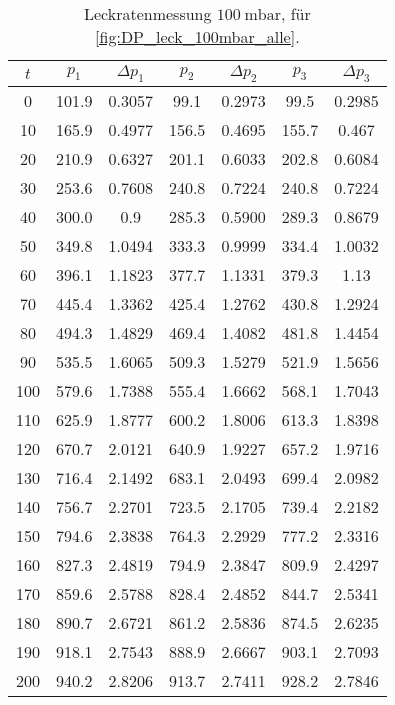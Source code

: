 \begin{table}[H]
    \centering
    \caption{Leckratenmessung $\SI{100}{\milli\bar}$, für  \autoref{fig:DP_leck_100mbar_alle}.}
    \label{tab:DP_leck_100mbar_alle}
    \begin{tabular}{c c c c c c c}
        \toprule
        {$t$} & {$p_1$} & {$\Delta p_1$} & {$p_2$} & {$\Delta p_2$} & {$p_3$} & {$\Delta p_3$} \\
        \midrule
        0 & 101.9 & 0.3057 & 99.1 & 0.2973 & 99.5 & 0.2985 \\
        10 & 165.9 & 0.4977 & 156.5 & 0.4695 & 155.7 & 0.467  \\
        20 & 210.9 & 0.6327 & 201.1 & 0.6033 & 202.8 & 0.6084  \\
        30 & 253.6 & 0.7608 & 240.8 & 0.7224 & 240.8 & 0.7224  \\
        40 & 300.0 & 0.9 & 285.3 & 0.5900 & 289.3 & 0.8679  \\
        50 & 349.8 & 1.0494 & 333.3 & 0.9999 & 334.4 & 1.0032  \\
        60 & 396.1 & 1.1823 & 377.7 & 1.1331 & 379.3 & 1.13  \\
        70 & 445.4 & 1.3362 & 425.4 & 1.2762 & 430.8 & 1.2924  \\
        80 & 494.3 & 1.4829 & 469.4 & 1.4082 & 481.8 & 1.4454  \\
        90 & 535.5 & 1.6065 & 509.3 & 1.5279 & 521.9 & 1.5656  \\
        100 & 579.6 & 1.7388 & 555.4 & 1.6662 & 568.1 & 1.7043 \\
        110 & 625.9 & 1.8777 & 600.2 & 1.8006 & 613.3 & 1.8398 \\
        120 & 670.7 & 2.0121 & 640.9 & 1.9227 & 657.2 & 1.9716 \\
        130 & 716.4 & 2.1492 & 683.1 & 2.0493 & 699.4 & 2.0982 \\
        140 & 756.7 & 2.2701 & 723.5 & 2.1705 & 739.4 & 2.2182 \\
        150 & 794.6 & 2.3838 & 764.3 & 2.2929 & 777.2 & 2.3316 \\
        160 & 827.3 & 2.4819 & 794.9 & 2.3847 & 809.9 & 2.4297 \\
        170 & 859.6 & 2.5788 & 828.4 & 2.4852 & 844.7 & 2.5341 \\
        180 & 890.7 & 2.6721 & 861.2 & 2.5836 & 874.5 & 2.6235 \\
        190 & 918.1 & 2.7543 & 888.9 & 2.6667 & 903.1 & 2.7093 \\
        200 & 940.2 & 2.8206 & 913.7 & 2.7411 & 928.2 & 2.7846 \\
        \bottomrule
    \end{tabular}
\end{table}

